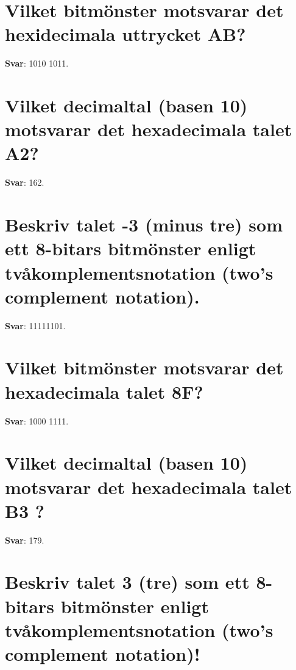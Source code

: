\documentclass[a4paper,11pt,oneside]{book}
\begin{document}
\begin{sloppypar}
\section{Vilket bitm\"onster motsvarar det hexidecimala uttrycket AB?}

\label{q:361:sa:sv:True}

\textbf{Svar}: 1010 1011.



\section{Vilket decimaltal (basen 10) motsvarar det hexadecimala talet A2?}

\label{q:362:sa:sv:True}

\textbf{Svar}: 162.



\section{Beskriv talet -3 (minus tre) som ett 8-bitars bitm\"onster enligt tv\r{a}komplementsnotation (two{\textquoteright}s complement notation).}

\label{q:363:sa:sv:True}

\textbf{Svar}: 11111101.



\section{Vilket bitm\"onster motsvarar det hexadecimala talet 8F?}

\label{q:364:sa:sv:True}

\textbf{Svar}: 1000 1111.



\section{Vilket decimaltal (basen 10) motsvarar det hexadecimala talet B3 ?}

\label{q:365:sa:sv:True}

\textbf{Svar}: 179.



\section{Beskriv talet 3 (tre) som ett 8-bitars bitm\"onster enligt tv\r{a}komplementsnotation (two{\textquoteright}s complement notation)!}


\end{sloppypar}
\end{document}
